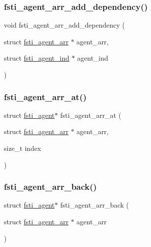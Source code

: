 \subsubsection{\texorpdfstring{fsti\+\_\+agent\+\_\+arr\+\_\+add\+\_\+dependency()}{fsti\_agent\_arr\_add\_dependency()}}
{\footnotesize\ttfamily void fsti\+\_\+agent\+\_\+arr\+\_\+add\+\_\+dependency (\begin{DoxyParamCaption}\item[{struct \mbox{\hyperlink{structfsti__agent__arr}{fsti\+\_\+agent\+\_\+arr}} $\ast$}]{agent\+\_\+arr,  }\item[{struct \mbox{\hyperlink{structfsti__agent__ind}{fsti\+\_\+agent\+\_\+ind}} $\ast$}]{agent\+\_\+ind }\end{DoxyParamCaption})}

\mbox{\label{fsti-agent_8c_a9f01e2df0acb48b1e9cef63d4314c209}} 
\subsubsection{\texorpdfstring{fsti\+\_\+agent\+\_\+arr\+\_\+at()}{fsti\_agent\_arr\_at()}}
{\footnotesize\ttfamily struct \mbox{\hyperlink{structfsti__agent}{fsti\+\_\+agent}}$\ast$ fsti\+\_\+agent\+\_\+arr\+\_\+at (\begin{DoxyParamCaption}\item[{struct \mbox{\hyperlink{structfsti__agent__arr}{fsti\+\_\+agent\+\_\+arr}} $\ast$}]{agent\+\_\+arr,  }\item[{size\+\_\+t}]{index }\end{DoxyParamCaption})}

\mbox{\label{fsti-agent_8c_a88eb4bd7a7df9dcbc5b57d3e3e22f9c6}} 
\subsubsection{\texorpdfstring{fsti\+\_\+agent\+\_\+arr\+\_\+back()}{fsti\_agent\_arr\_back()}}
{\footnotesize\ttfamily struct \mbox{\hyperlink{structfsti__agent}{fsti\+\_\+agent}}$\ast$ fsti\+\_\+agent\+\_\+arr\+\_\+back (\begin{DoxyParamCaption}\item[{struct \mbox{\hyperlink{structfsti__agent__arr}{fsti\+\_\+agent\+\_\+arr}} $\ast$}]{agent\+\_\+arr }\end{DoxyParamCaption})}

